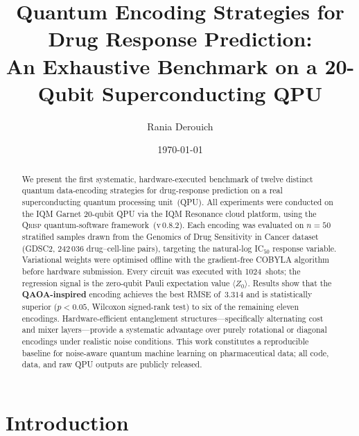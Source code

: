 \documentclass[twocolumn,aps,pra,superscriptaddress,floatfix]{revtex4-2}
\newcommand{\qrisp}{\textsc{Qrisp}}
\newcommand{\iqm}{\textsc{IQM}}
\newcommand{\cobyla}{\textsc{COBYLA}}
\newcommand{\expvz}{\ensuremath{\langle Z_0 \rangle}}
\begin{document}
\title{Quantum Encoding Strategies for Drug Response Prediction:\\
       An Exhaustive Benchmark on a 20-Qubit Superconducting QPU}

\author{Rania Derouich}

\date{\today}

\begin{abstract}
We present the first systematic, hardware-executed benchmark of twelve distinct
quantum data-encoding strategies for drug-response prediction on a real
superconducting quantum processing unit~(QPU).
All experiments were conducted on the \iqm{} Garnet 20-qubit QPU via the
\iqm{} Resonance cloud platform, using the \qrisp{} quantum-software
framework~(v\,0.8.2).
Each encoding was evaluated on $n=50$ stratified samples drawn from the
Genomics of Drug Sensitivity in Cancer dataset (GDSC2, 242\,036
drug--cell-line pairs), targeting the natural-log IC$_{50}$ response variable.
Variational weights were optimised offline with the gradient-free \cobyla{}
algorithm before hardware submission.
Every circuit was executed with 1024~shots; the regression signal is the
zero-qubit Pauli expectation value $\expvz$.
Results show that the \textbf{QAOA-inspired} encoding achieves the best
RMSE of~$3.314$ and is statistically superior ($p<0.05$, Wilcoxon signed-rank
test) to six of the remaining eleven encodings.
Hardware-efficient entanglement structures---specifically alternating cost and
mixer layers---provide a systematic advantage over purely rotational or diagonal
encodings under realistic noise conditions.
This work constitutes a reproducible baseline for noise-aware quantum machine
learning on pharmaceutical data; all code, data, and raw QPU outputs are
publicly released.
\end{abstract}

\maketitle

\section{Introduction}
\label{sec:intro}
\end{document}
